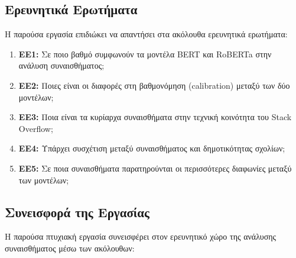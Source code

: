 \documentclass[a4paper,11pt,oneside,openany]{ioniothesis}
\begin{document}
\subsection{Ερευνητικά Ερωτήματα}
\label{sec:Ερευνητικά Ερωτήματα}

Η παρούσα εργασία επιδιώκει να απαντήσει στα ακόλουθα ερευνητικά ερωτήματα:

\begin{enumerate}
    \item \textbf{ΕΕ1:} Σε ποιο βαθμό συμφωνούν τα μοντέλα BERT και RoBERTa στην ανάλυση συναισθήματος;
    
    \item \textbf{ΕΕ2:} Ποιες είναι οι διαφορές στη βαθμονόμηση (calibration) μεταξύ των δύο μοντέλων;
    
    \item \textbf{ΕΕ3:} Ποια είναι τα κυρίαρχα συναισθήματα στην τεχνική κοινότητα του Stack Overflow;
    
    \item \textbf{ΕΕ4:} Υπάρχει συσχέτιση μεταξύ συναισθήματος και δημοτικότητας σχολίων;
    
    \item \textbf{ΕΕ5:} Σε ποια συναισθήματα παρατηρούνται οι περισσότερες διαφωνίες μεταξύ των μοντέλων;
\end{enumerate}

\subsection{Συνεισφορά της Εργασίας}
\label{sec:Συνεισφορά της Εργασίας}

Η παρούσα πτυχιακή εργασία συνεισφέρει στον ερευνητικό χώρο της ανάλυσης συναισθήματος μέσω των ακόλουθων:
\end{document}
